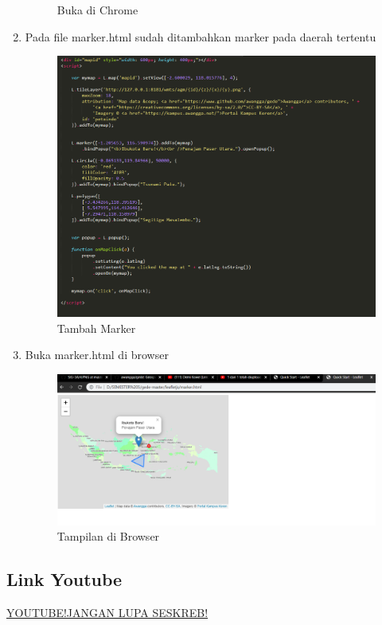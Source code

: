\begin{enumerate}
\begin{figure}[H]
		\centering
		\caption{Buka di Chrome}
	\end{figure}
    \item Pada file marker.html sudah ditambahkan marker pada daerah tertentu
    \hfill\break
    \begin{figure}[H]
		\includegraphics[width=12cm]{figures/1174050/tugas5/4.PNG}
		\centering
		\caption{Tambah Marker}
	\end{figure}
    \item Buka marker.html di browser
    \hfill\break
    \begin{figure}[H]
		\includegraphics[width=12cm]{figures/1174050/tugas5/5.PNG}
		\centering
		\caption{Tampilan di Browser}
	\end{figure}
\end{enumerate}
\subsection{Link Youtube}
\href{https://youtu.be/1eIGj9vYuS4}{YOUTUBE!JANGAN LUPA SESKREB!}
